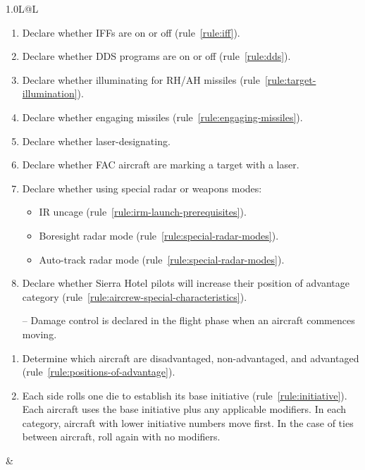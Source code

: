 \begin{twocolumntable}
\begin{tabularx}{1.0\linewidth}{L@{\hspace{\columnsep}}L}
{\begin{enumerate}
\begin{enumerate}[nosep]
    \item Declare whether IFFs are on or off (rule~\ref{rule:iff}).
    \item Declare whether DDS programs are on or off (rule~\ref{rule:dds}).
    \item Declare whether illuminating for RH/AH missiles (rule~\ref{rule:target-illumination}).
    \item Declare whether engaging missiles (rule~\ref{rule:engaging-missiles}).
    \item Declare whether laser-designating.
    \item Declare whether FAC aircraft are marking a target with a laser.
    \item Declare whether using special radar or weapons modes:
    \begin{itemize}
        \item IR uncage (rule~\ref{rule:irm-launch-prerequisites}).
        \item Boresight radar mode (rule~\ref{rule:special-radar-modes}).
        \item Auto-track radar mode (rule~\ref{rule:special-radar-modes}).
    \end{itemize}
    \item Declare whether Sierra Hotel pilots will increase their position of advantage category (rule~\ref{rule:aircrew-special-characteristics}).
    \item[--] Damage control is declared in the flight phase when an aircraft commences moving.
\end{enumerate}


\begin{enumerate}[nosep]
    \item Determine which aircraft are disadvantaged, non-advantaged, and advantaged (rule~\ref{rule:positions-of-advantage}).
    \item Each side rolls one die to establish its base initiative (rule~\ref{rule:initiative}). Each aircraft uses the base initiative plus any applicable modifiers. In each category, aircraft with lower initiative numbers move first. In the case of ties between aircraft, roll again with no modifiers.
\end{enumerate}

\end{enumerate}

&

}
\end{tabularx}
\end{twocolumntable}
